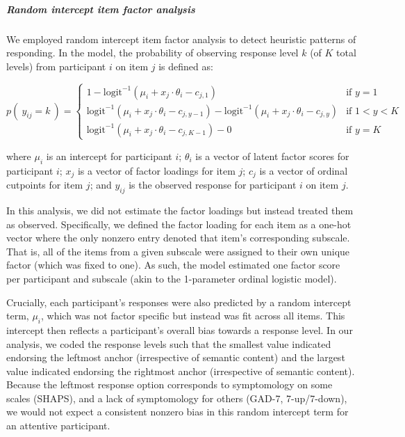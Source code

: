 \documentclass[a4paper,notitlepage,12pt]{article}
\begin{document}
\begin{refsection}[main]
\subparagraph{Random intercept item factor analysis} We employed random intercept item factor analysis \cite{maydeu2006random} to detect heuristic patterns of responding. In the model, the probability of observing response level $k$ (of $K$ total levels) from participant $i$ on item $j$ is defined as:

\begin{equation*}
    p( \ y_{ij} = k \ ) = \left\{ \begin{array}{ll}
1 - \text{logit}^{-1}( \mu_i + x_j\cdot \theta_i - c_{j,1})  &  \text{if } y = 1 \\[4pt]
\text{logit}^{-1}( \mu_i + x_j\cdot \theta_i - c_{j,y-1}) - \text{logit}^{-1}( \mu_i + x_j\cdot \theta_i - c_{j,y}) & \text{if } 1 < y < K \\[4pt]
\text{logit}^{-1}( \mu_i + x_j\cdot \theta_i - c_{j,K-1}) - 0  &  \text{if } y = K
\end{array} \right.
\end{equation*}

where $\mu_i$ is an intercept for participant $i$; $\theta_i$ is a vector of latent factor scores for participant $i$; $x_j$ is a vector of factor loadings for item $j$; $c_j$ is a vector of ordinal cutpoints for item $j$; and $y_{ij}$ is the observed response for participant $i$ on item $j$.

In this analysis, we did not estimate the factor loadings but instead treated them as observed. Specifically, we defined the factor loading for each item as a one-hot vector where the only nonzero entry denoted that item's corresponding subscale. That is, all of the items from a given subscale were assigned to their own unique factor (which was fixed to one). As such, the model estimated one factor score per participant and subscale (akin to the 1-parameter ordinal logistic model).

Crucially, each participant's responses were also predicted by a random intercept term, $\mu_i$, which was not factor specific but instead was fit across all items. This intercept then reflects a participant's overall bias towards a response level. In our analysis, we coded the response levels such that the smallest value indicated endorsing the leftmost anchor (irrespective of semantic content) and the largest value indicated endorsing the rightmost anchor (irrespective of semantic content). Because the leftmost response option corresponds to symptomology on some scales (SHAPS), and a lack of symptomology for others (GAD-7, 7-up/7-down), we would not expect a consistent nonzero bias in this random intercept term for an attentive participant. 


\end{refsection}
\end{document}
